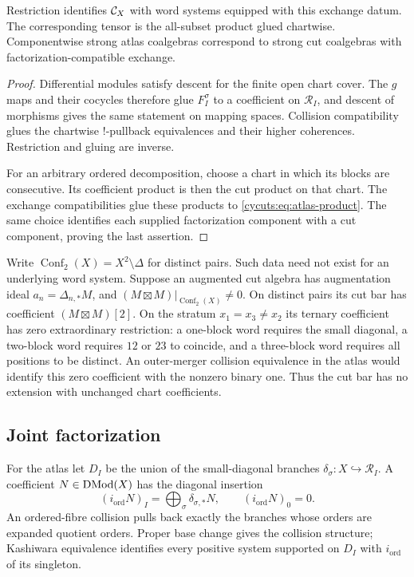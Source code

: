 \begin{proposition}\label{cycuts:prop:descent}
Restriction identifies $\mathcal C_X$ with word systems equipped with this
exchange datum. The corresponding tensor is the all-subset product
glued chartwise. Componentwise strong atlas coalgebras correspond
to strong cut coalgebras with factorization-compatible exchange.
\end{proposition}
\begin{proof}
Differential modules satisfy descent for the finite open chart cover.
The $g$ maps and their cocycles therefore glue $F_I^\sigma$ to a
coefficient on $\mathscr R_I$, and descent of morphisms gives the
same statement on mapping spaces. Collision compatibility glues
the chartwise $!$-pullback equivalences and their higher coherences.
Restriction and gluing are inverse.

For an arbitrary ordered decomposition, choose a chart in which its
blocks are consecutive. Its coefficient product is then the cut
product on that chart. The exchange compatibilities glue these
products to \eqref{cycuts:eq:atlas-product}. The same choice identifies
each supplied factorization component with a cut component, proving
the last assertion.
\end{proof}

Write $\operatorname{Conf}_2(X)=X^2\setminus\Delta$ for distinct pairs.
Such data need not exist for an underlying word system. Suppose an
augmented cut algebra has augmentation ideal $a_n=\Delta_{n,*}M$,
and $(M\boxtimes M)|_{\operatorname{Conf}_2(X)}\ne0$. On distinct
pairs its cut bar has coefficient $(M\boxtimes M)[2]$. On the
stratum $x_1=x_3\ne x_2$ its ternary coefficient has zero
extraordinary restriction: a one-block word requires the small
diagonal, a two-block word requires $12$ or $23$ to coincide,
and a three-block word requires all positions to be distinct.
An outer-merger collision equivalence in the atlas would identify
this zero coefficient with the nonzero binary one. Thus the cut bar
has no extension with unchanged chart coefficients.

\subsection{Joint factorization}

For the atlas let $D_I$ be the union of the small-diagonal branches
$\delta_\sigma:X\hookrightarrow\mathscr R_I$. A coefficient
$N\in\operatorname{DMod}(X)$ has the diagonal insertion
\[
 (i_{\mathrm{ord}}N)_I=\bigoplus_\sigma\delta_{\sigma,*}N,
 \qquad(i_{\mathrm{ord}}N)_0=0.
\]
An ordered-fibre collision pulls back exactly the branches whose
orders are expanded quotient orders. Proper base change gives the
collision structure; Kashiwara equivalence identifies every positive
system supported on $D_I$ with $i_{\mathrm{ord}}$ of its singleton.

